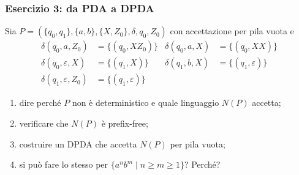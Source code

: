 \begin{frame}[fragile]
        \frametitle{Esercizio 3: da PDA a DPDA}
Sia $P = (\{q_0, q_1\}, \{a,b\}, \{X, Z_0\}, \delta, q_0, Z_0)$ con accettazione per pila vuota e
\begin{align*}
\delta(q_0, a, Z_0) & = \{(q_0, XZ_0)\} &
\delta(q_0, a, X) & = \{(q_0, XX)\}\\
\delta(q_0, \varepsilon, X) & = \{(q_1, X)\} &
\delta(q_1, b, X) & = \{(q_1, \varepsilon)\}\\
\delta(q_1, \varepsilon, Z_0) & = \{(q_1, \varepsilon)\}
\end{align*}
\begin{enumerate}
\item dire perché $P$ non è deterministico e quale linguaggio $N(P)$ accetta;
\item verificare che $N(P)$ è prefix-free;
\item costruire un DPDA che accetta $N(P)$ per pila vuota;
\item si può fare lo stesso per $\{a^n b^m \mid n \ge m \ge 1\}$? Perché?
\end{enumerate}
\end{frame}



